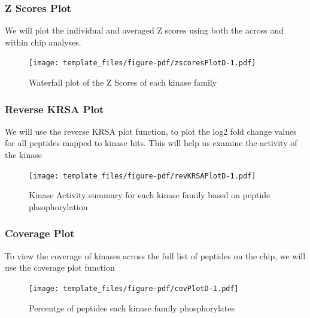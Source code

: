 \documentclass[
  letterpaper,
  DIV=11,
  numbers=noendperiod]{scrreport}
\begin{document}
\hypertarget{z-scores-plot-3}{%
\subsubsection{Z Scores Plot}\label{z-scores-plot-3}}

We will plot the individual and averaged Z scores using both the across
and within chip analyses.

\begin{figure}[htbp]

{\centering \texttt{[image: template\_files/figure-pdf/zscoresPlotD-1.pdf]}

}

\caption{Waterfall plot of the Z Scores of each kinase family}

\end{figure}

\hypertarget{reverse-krsa-plot-3}{%
\subsubsection{Reverse KRSA Plot}\label{reverse-krsa-plot-3}}

We will use the reverse KRSA plot function, to plot the log2 fold change
values for all peptides mapped to kinase hits. This will help us examine
the activity of the kinase

\begin{figure}[htbp]

{\centering \texttt{[image: template\_files/figure-pdf/revKRSAPlotD-1.pdf]}

}

\caption{Kinase Activity summary for each kinase family based on peptide
phsophorylation}

\end{figure}

\hypertarget{coverage-plot-3}{%
\subsubsection{Coverage Plot}\label{coverage-plot-3}}

To view the coverage of kinases across the full list of peptides on the
chip, we will use the coverage plot function

\begin{figure}[htbp]

{\centering \texttt{[image: template\_files/figure-pdf/covPlotD-1.pdf]}

}

\caption{Percentge of peptides each kinase family phosphorylates}

\end{figure}
\end{document}
